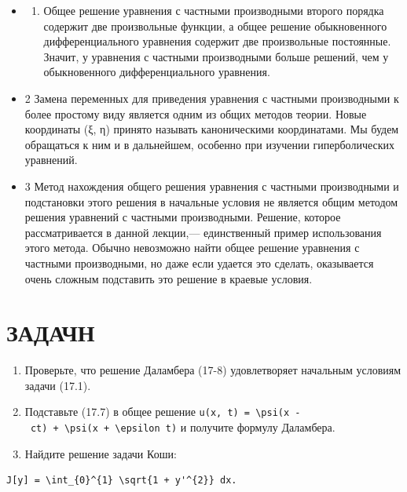 \documentclass[
  ukrainian,
]{article}
\providecommand{\tightlist}{%
  \setlength{\itemsep}{0pt}\setlength{\parskip}{0pt}}
\begin{document}
\begin{itemize}
\tightlist
\item
  \begin{enumerate}
  \def\labelenumi{\arabic{enumi}.}
  \tightlist
  \item
    Общее решение уравнения с частными производными второго порядка
    содержит две произвольные функции, а общее решение обыкновенного
    дифференциального уравнения содержит две произвольные постоянные.
    Значит, у уравнения с частными производными больше решений, чем у
    обыкновенного дифференциального уравнения.
  \end{enumerate}
\item
  2 Замена переменных для приведения уравнения с частными производными к
  более простому виду является одним из общих методов теории. Новые
  координаты (ξ, η) принято называть каноническими координатами. Мы
  будем обращаться к ним и в дальнейшем, особенно при изучении
  гиперболических уравнений.
\item
  3 Метод нахождения общего решения уравнения с частными производными и
  подстановки этого решения в начальные условия не является общим
  методом решения уравнений с частными производными. Решение, которое
  рассматривается в данной лекции,--- единственный пример использования
  этого метода. Обычно невозможно найти общее решение уравнения с
  частными производными, но даже если удается это сделать, оказывается
  очень сложным подставить это решение в краевые условия.
\end{itemize}

\section{ЗАДАЧН}\label{ux437ux430ux434ux430ux447ux43d}

\begin{enumerate}
\def\labelenumi{\arabic{enumi}.}
\item
  Проверьте, что решение Даламбера (17-8) удовлетворяет начальным
  условиям задачи (17.1).
\item
  Подставьте (17.7) в общее решение
  \texttt{u(x,\ t)\ =\ \textbackslash{}psi(x\ -\ ct)\ +\ \textbackslash{}psi(x\ +\ \textbackslash{}epsilon\ t)}
  и получите формулу Даламбера.
\item
  Найдите решение задачи Коши:
\end{enumerate}

\begin{verbatim}
J[y] = \int_{0}^{1} \sqrt{1 + y'^{2}} dx.
\end{verbatim}
\end{document}
